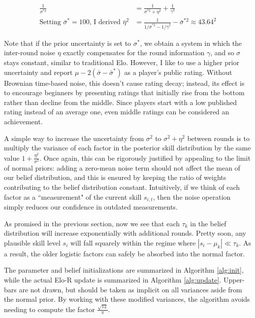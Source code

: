 \documentclass{article}
\begin{document}
\begin{align}
\frac{1}{\sigma^{*2}} &= \frac{1}{\sigma^{*2} + \eta^2} + \frac{1}{\gamma^2}
\\ \text{Setting }\bar\sigma^*=100\text{, I derived }\bar\eta^2 &= \frac{1}{1/\bar\sigma^{*2} - 1/\bar\gamma^2} - \bar\sigma^{*2} \approx 43.64^2
\end{align}

Note that if the prior uncertainty is set to $\sigma^*$, we obtain a system in which the inter-round noise $\eta$ exactly compensates for the round information $\gamma$, and so $\sigma$ stays constant, similar to traditional Elo. However, I like to use a higher prior uncertainty and report $\mu-2(\bar\sigma-\bar\sigma^*)$ as a player's public rating. Without Brownian time-based noise, this doesn't cause rating decay; instead, its effect is to encourage beginners by presenting ratings that initially rise from the bottom rather than decline from the middle. Since players start with a low published rating instead of an average one, even middle ratings can be considered an achievement.

A simple way to increase the uncertainty from $\sigma^2$ to $\sigma^2 + \eta^2$ between rounds is to multiply the variance of each factor in the posterior skill distribution by the same value $1 + \frac{\eta^2}{\sigma^2}$. Once again, this can be rigorously justified by appealing to the limit of normal priors: adding a zero-mean noise term should not affect the mean of our belief distribution, and this is ensured by keeping the ratio of weights contributing to the belief distribution constant.  Intuitively, if we think of each factor as a ``measurement" of the current skill $s_{i,t}$, then the noise operation simply reduces our confidence in outdated measurements.

As promised in the previous section, now we see that each $\tau_k$ in the belief distribution will increase exponentially with additional rounds. Pretty soon, any plausible skill level $s_i$ will fall squarely within the regime where $|s_i-\mu_k| \ll \tau_k$. As a result, the older logistic factors can safely be absorbed into the normal factor.

The parameter and belief initializations are summarized in Algorithm \ref{alg:init}, while the actual Elo-R update is summarized in Algorithm \ref{alg:update}. Upper-bars are not drawn, but should be taken as implicit on all variances aside from the normal prior. By working with these modified variances, the algorithm avoids needing to compute the factor $\frac{\sqrt{12}}{\pi}$.
\end{document}
